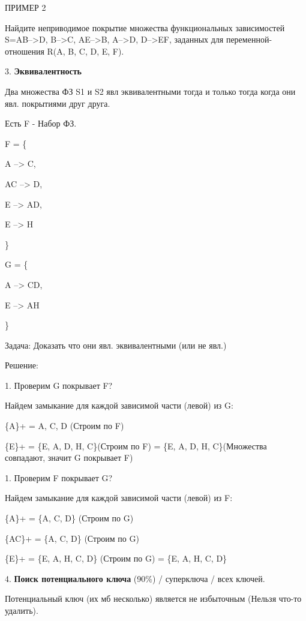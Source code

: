 ПРИМЕР 2

Найдите неприводимое покрытие множества функциональных зависимостей S={AB–>D, B–>C, AE–>B, A–>D, D–>EF}, заданных для переменной-отношения R(A, B, C, D, E, F).



\begin{figure}[ht!]
\end{figure}



3. \textbf{Эквивалентность}

Два множества ФЗ S1 и S2 явл эквивалентными тогда и только
тогда когда они явл. покрытиями друг друга.

Есть F - Набор ФЗ.



F = \{

A --> C,

AC --> D,

E --> AD,

E --> H

\}

G = \{

A --> CD,

E --> AH

\}

Задача: Доказать что они явл. эквивалентными (или не явл.)

Решение:

1. Проверим G покрывает F?

Найдем замыкание для каждой зависимой части (левой) из G:

\{A\}+ = {A, C, D} (Строим по F)

\{E\}+ = \{E, A, D, H, C\}(Строим по F) = \{E, A, D, H, C\}(Множества
совпадают, значит G покрывает F)

1. Проверим F покрывает G?

Найдем замыкание для каждой зависимой части (левой) из F:

\{A\}+ = \{A, C, D\} (Строим по G)

\{AC\}+ = \{A, C, D\} (Строим по G)

\{E\}+ = \{E, A, H, C, D\} (Строим по G) = \{E, A, H, C, D\}


4. \textbf{Поиск потенциального ключа} (90\%) / суперключа / всех ключей.

Потенциальный ключ (их мб несколько) является не избыточным (Нельзя что-то удалить).


